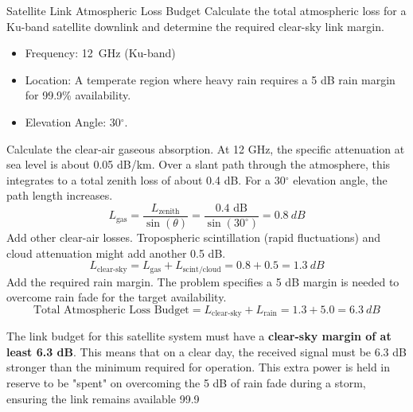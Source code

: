 \begin{workedexample}{Satellite Link Atmospheric Loss Budget}
     Calculate the total atmospheric loss for a Ku-band satellite downlink and determine the required clear-sky link margin.
    \begin{itemize}
        \item Frequency: \qty{12}{GHz} (Ku-band)
        \item Location: A temperate region where heavy rain requires a 5 dB rain margin for 99.9\% availability.
        \item Elevation Angle: 30$^\circ$.
    \end{itemize}
    \begin{derivationsteps}
        \step Calculate the clear-air gaseous absorption. At 12 GHz, the specific attenuation at sea level is about 0.05 dB/km. Over a slant path through the atmosphere, this integrates to a total zenith loss of about 0.4 dB. For a 30$^\circ$ elevation angle, the path length increases.
        \[ L_{\text{gas}} = \frac{L_{\text{zenith}}}{\sin(\theta)} = \frac{0.4 \text{ dB}}{\sin(30^\circ)} = \qty{0.8}{dB} \]
        \step Add other clear-air losses. Tropospheric scintillation (rapid fluctuations) and cloud attenuation might add another 0.5 dB.
        \[ L_{\text{clear-sky}} = L_{\text{gas}} + L_{\text{scint/cloud}} = 0.8 + 0.5 = \qty{1.3}{dB} \]
        \step Add the required rain margin. The problem specifies a 5 dB margin is needed to overcome rain fade for the target availability.
        \[ \text{Total Atmospheric Loss Budget} = L_{\text{clear-sky}} + L_{\text{rain}} = 1.3 + 5.0 = \qty{6.3}{dB} \]
    \end{derivationsteps}
     The link budget for this satellite system must have a \textbf{clear-sky margin of at least 6.3 dB}. This means that on a clear day, the received signal must be 6.3 dB stronger than the minimum required for operation. This extra power is held in reserve to be "spent" on overcoming the 5 dB of rain fade during a storm, ensuring the link remains available 99.9%
\end{workedexample}

